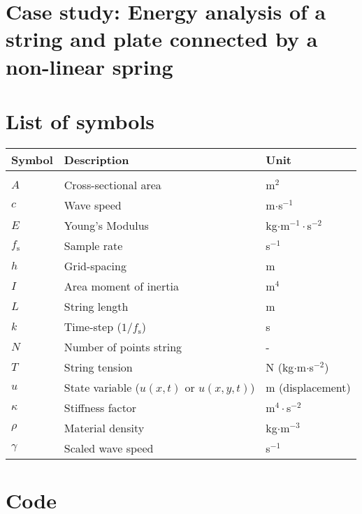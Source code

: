 \documentclass{article}
\begin{document}
\section{Case study: Energy analysis of a string and plate connected by a non-linear spring}


\appendix
\section{List of symbols} \label{app:A}
{\renewcommand{\arraystretch}{1.1}
\begin{tabular}{ p{3cm} p{7cm} p{4cm}  }
 Symbol & Description & Unit\\
 \hline\\
 $A$ & Cross-sectional area & m$^2$\\
 $c$ & Wave speed & m$\cdot$s$^{-1}$\\
 $E$ & Young's Modulus & kg$\cdot$m$^{-1}\cdot$s$^{-2}$\\
 $f_\text{s}$ & Sample rate & s$^{-1}$\\
 $h$ & Grid-spacing & m \\ 
 $I$ & Area moment of inertia \cite{Desv2017} & m$^4$\\
 $L$ & String length & m\\
 $k$ & Time-step ($1/f_\text{s}$) & s\\
 $N$ & Number of points string & -\\
 $T$ & String tension & N (kg$\cdot$m$\cdot$s$^{-2}$) \\
 $u$ & State variable ($u(x,t)\text{ or }u(x,y,t)$) & m (displacement)\\ 
 $\kappa$ & Stiffness factor & m$^4\cdot$s$^{-2}$\\
 $\rho$ & Material density & kg$\cdot$m$^{-3}$\\
 $\gamma$ & Scaled wave speed & s$^{-1}$\\
\end{tabular}
}
\section{Code}



\end{document}
